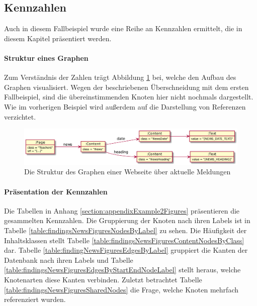\subsection{Kennzahlen}
    Auch in diesem Fallbeispiel wurde eine Reihe an Kennzahlen ermittelt,
    die in diesem Kapitel präsentiert werden.

    \paragraph*{Struktur eines Graphen}
    Zum Verständnis der Zahlen trägt Abbildung \ref{image:findingNewsFiguresDbModel} bei,
    welche den Aufbau des Graphen visualisiert.
    Wegen der beschriebenen Überschneidung mit dem ersten Fallbeispiel,
    sind die übereinstimmenden Knoten hier nicht nochmals dargestellt.
    Wie im vorherigen Beispiel wird außerdem auf die Darstellung von
    Referenzen verzichtet.

    \begin{figure}[htb]
        \centering
        \includegraphics[scale=\imageScalingFactor]{../resources/findings/case-study-2/dbmodel.png}
        \caption{Die Struktur des Graphen einer Webseite über aktuelle Meldungen}
        \label{image:findingNewsFiguresDbModel}
    \end{figure}

    \paragraph*{Präsentation der Kennzahlen}
    Die Tabellen in Anhang \ref{section:appendixExample2Figures} präsentieren die gesammelten Kennzahlen.
    Die Gruppierung der Knoten nach ihren Labels ist in Tabelle
    \ref{table:findingsNewsFiguresNodesByLabel} zu sehen.
    Die Häufigkeit der Inhaltsklassen stellt Tabelle
    \ref{table:findingsNewsFiguresContentNodesByClass} dar.
    Tabelle \ref{table:findingNewsFiguresEdgesByLabel} gruppiert die Kanten der Datenbank
    nach ihren Labels und Tabelle
    \ref{table:findingsNewsFiguresEdgesByStartEndNodeLabel}
    stellt heraus, welche Knotenarten diese Kanten verbinden.
    Zuletzt betrachtet Tabelle \ref{table:findingsNewsFiguresSharedNodes}
    die Frage, welche Knoten mehrfach referenziert wurden.
